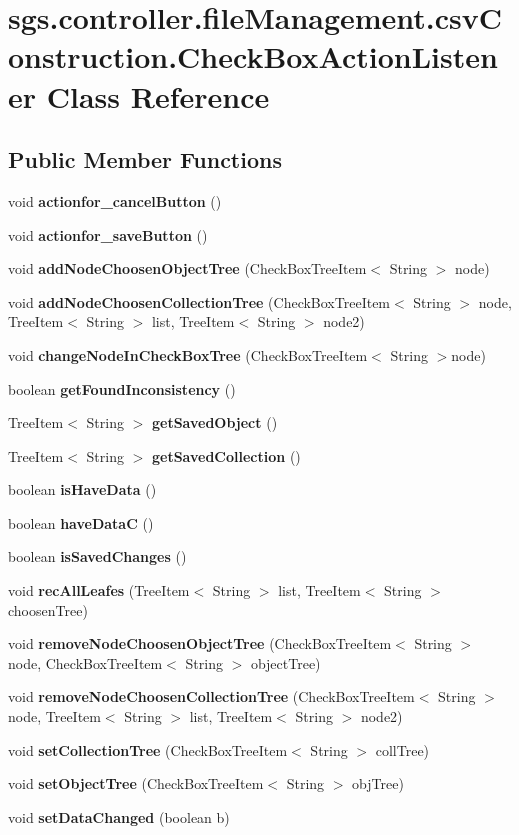 \section{sgs.\-controller.\-file\-Management.\-csv\-Construction.\-Check\-Box\-Action\-Listener Class Reference}
\label{classsgs_1_1controller_1_1file_management_1_1csv_construction_1_1_check_box_action_listener}
\subsection*{Public Member Functions}
\begin{DoxyCompactItemize}
\item 
void {\bf actionfor\-\_\-cancel\-Button} ()
\item 
void {\bf actionfor\-\_\-save\-Button} ()
\item 
void {\bf add\-Node\-Choosen\-Object\-Tree} (Check\-Box\-Tree\-Item$<$ String $>$ node)
\item 
void {\bf add\-Node\-Choosen\-Collection\-Tree} (Check\-Box\-Tree\-Item$<$ String $>$ node, Tree\-Item$<$ String $>$ list, Tree\-Item$<$ String $>$ node2)
\item 
void {\bf change\-Node\-In\-Check\-Box\-Tree} (Check\-Box\-Tree\-Item$<$ String $>$node)
\item 
boolean {\bf get\-Found\-Inconsistency} ()
\item 
Tree\-Item$<$ String $>$ {\bf get\-Saved\-Object} ()
\item 
Tree\-Item$<$ String $>$ {\bf get\-Saved\-Collection} ()
\item 
boolean {\bf is\-Have\-Data} ()
\item 
boolean {\bf have\-Data\-C} ()
\item 
boolean {\bf is\-Saved\-Changes} ()
\item 
void {\bf rec\-All\-Leafes} (Tree\-Item$<$ String $>$ list, Tree\-Item$<$ String $>$ choosen\-Tree)
\item 
void {\bf remove\-Node\-Choosen\-Object\-Tree} (Check\-Box\-Tree\-Item$<$ String $>$ node, Check\-Box\-Tree\-Item$<$ String $>$ object\-Tree)
\item 
void {\bf remove\-Node\-Choosen\-Collection\-Tree} (Check\-Box\-Tree\-Item$<$ String $>$ node, Tree\-Item$<$ String $>$ list, Tree\-Item$<$ String $>$ node2)
\item 
void {\bf set\-Collection\-Tree} (Check\-Box\-Tree\-Item$<$ String $>$ coll\-Tree)
\item 
void {\bf set\-Object\-Tree} (Check\-Box\-Tree\-Item$<$ String $>$ obj\-Tree)
\item 
void {\bf set\-Data\-Changed} (boolean b)
\end{DoxyCompactItemize}
